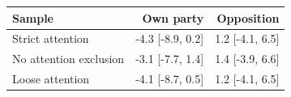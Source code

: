 \begin{tabular}{lrr}
\toprule
Sample & Own party & Opposition \\
\midrule
Strict attention & -4.3 [-8.9, 0.2] & 1.2 [-4.1, 6.5] \\
No attention exclusion & -3.1 [-7.7, 1.4] & 1.4 [-3.9, 6.6] \\
Loose attention & -4.1 [-8.7, 0.5] & 1.2 [-4.1, 6.5] \\
\bottomrule
\end{tabular}
